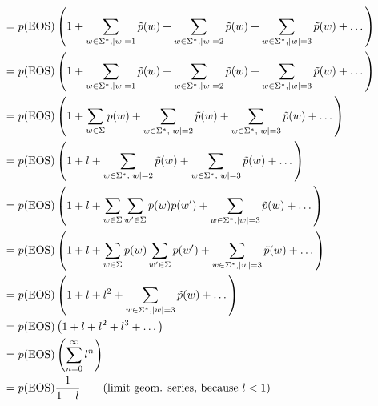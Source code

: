 \documentclass[a4paper,12pt]{ETHexercise}
\begin{document}
\begin{question}
\begin{subquestion}
\begin{align}
			                           & = p(\eos) \left( 1 + \sum_{w \in \Sigma^*, |w|=1} \tilde{p}(w) + \sum_{w \in \Sigma^*, |w|=2} \tilde{p}(w) + \sum_{w \in \Sigma^*, |w|=3} \tilde{p}(w) + \dots                                         \right) \\
			                           & = p(\eos) \left( 1 + \sum_{w \in \Sigma^*, |w|=1} \tilde{p}(w) + \sum_{w \in \Sigma^*, |w|=2}  \tilde{p}(w) + \sum_{w \in \Sigma^*, |w|=3}  \tilde{p}(w) + \dots  \right)                                      \\
			                           & =  p(\eos) \left( 1 + \sum_{w \in \Sigma} p(w) + \sum_{w \in \Sigma^*, |w|=2}  \tilde{p}(w) + \sum_{w \in \Sigma^*, |w|=3}  \tilde{p}(w) + \dots \right)                                                       \\
			                           & = p(\eos) \left( 1 + l + \sum_{w \in \Sigma^*, |w|=2}  \tilde{p}(w) + \sum_{w \in \Sigma^*, |w|=3}  \tilde{p}(w) + \dots  \right)                                                                              \\
			                           & = p(\eos) \left( 1 + l + \sum_{w \in \Sigma} \sum_{w' \in \Sigma} p(w)p(w') + \sum_{w \in \Sigma^*, |w|=3}  \tilde{p}(w) + \dots \right)                                                                       \\
			                           & = p(\eos) \left( 1 + l +  \sum_{w \in \Sigma} p(w) \sum_{w' \in \Sigma} p(w') + \sum_{w \in \Sigma^*, |w|=3}  \tilde{p}(w) + \dots  \right)                                                                    \\
			                           & = p(\eos) \left( 1 + l + l^2 + \sum_{w \in \Sigma^*, |w|=3}  \tilde{p}(w) + \dots   \right)                                                                                                                    \\
			                           & = p(\eos) \left( 1 + l + l^2 + l^3 + \dots     \right)                                                                                                                                                         \\
			                           & = p(\eos) \left(\sum_{n=0}^{\infty} l^n                                                 \right)                                                                                                                \\
			                           & = p(\eos) \frac{1}{1-l} \quad\quad \text{(limit geom. series, because $l < 1$)} \label{1b_sum_p2}                                                                                                              \\

\end{align}
\end{subquestion}
\end{question}
\end{document}
